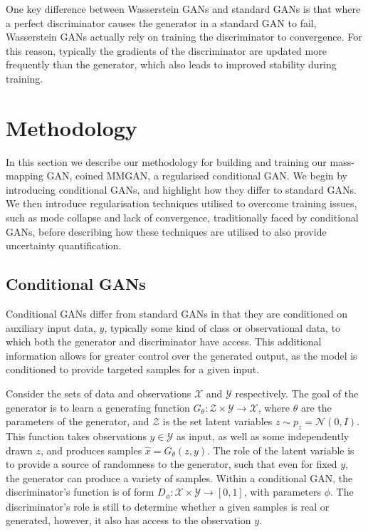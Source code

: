 \documentclass[fleqn,usenatbib]{mnras}
\begin{document}
One key difference between Wasserstein GANs and standard GANs is that where a perfect discriminator causes the generator in a standard GAN to fail, Wasserstein GANs actually rely on training the discriminator 
to convergence. For this reason, typically the gradients of the discriminator are updated more frequently than the generator, which also leads to improved stability 
during training.

\section{Methodology}\label{sec:methodology}

In this section we describe our methodology for building and training our mass-mapping GAN, coined MMGAN, a regularised conditional GAN. We begin 
by introducing conditional GANs, and highlight how they differ to standard GANs. We then introduce regularisation techniques utilised 
to overcome training issues, such as mode collapse and lack of convergence, traditionally faced by conditional GANs, before describing how these techniques are utilised to also provide uncertainty quantification.

\subsection{Conditional GANs}\label{subsec:conditional_gans}

Conditional GANs \citep{adler2018deep} differ from standard GANs in that they are conditioned on auxiliary input data, $y$, typically some kind of class or observational data, to which both the generator and discriminator have access. This additional information allows for greater control over the generated output, as the model is conditioned to provide targeted samples for a given input.

Consider the sets of data and observations $\mathcal{X}$ and $\mathcal{Y}$ respectively. The goal of the generator is to learn a generating function $G_\theta : \mathcal{Z} \times\mathcal{Y} \rightarrow \mathcal{X}$, where $\theta$ are the parameters of the generator, and $\mathcal{Z}$ is the set latent variables $z \sim p_z = \mathcal{N}(0, I)$. This function takes observations $y \in \mathcal{Y}$ as input, as well as some independently drawn $z$, and produces samples $\hat{x} = G_\theta (z,y)$. The role of the latent variable is to provide a source of randomness to the generator, such that even for fixed $y$, the generator can produce a variety of samples. Within a conditional GAN, the discriminator's function is of form $D_\phi : \mathcal{X} \times \mathcal{Y} \rightarrow [0, 1]$, with parameters $\phi$. The discriminator's role is still to determine whether a given samples is real or generated, however, it also has access to the observation $y$.
\end{document}

